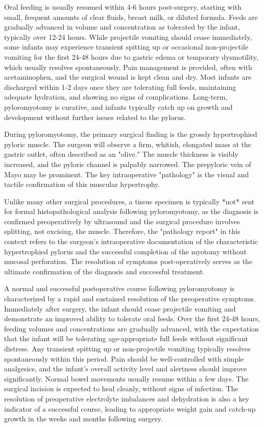 Oral feeding is usually resumed within 4-6 hours post-surgery, starting with small, frequent amounts of clear fluids, breast milk, or diluted formula. Feeds are gradually advanced in volume and concentration as tolerated by the infant, typically over 12-24 hours. While projectile vomiting should cease immediately, some infants may experience transient spitting up or occasional non-projectile vomiting for the first 24-48 hours due to gastric edema or temporary dysmotility, which usually resolves spontaneously. Pain management is provided, often with acetaminophen, and the surgical wound is kept clean and dry. Most infants are discharged within 1-2 days once they are tolerating full feeds, maintaining adequate hydration, and showing no signs of complications. Long-term, pyloromyotomy is curative, and infants typically catch up on growth and development without further issues related to the pylorus.

During pyloromyotomy, the primary surgical finding is the grossly hypertrophied pyloric muscle. The surgeon will observe a firm, whitish, elongated mass at the gastric outlet, often described as an "olive." The muscle thickness is visibly increased, and the pyloric channel is palpably narrowed. The prepyloric vein of Mayo may be prominent. The key intraoperative "pathology" is the visual and tactile confirmation of this muscular hypertrophy.

Unlike many other surgical procedures, a tissue specimen is typically *not* sent for formal histopathological analysis following pyloromyotomy, as the diagnosis is confirmed preoperatively by ultrasound and the surgical procedure involves splitting, not excising, the muscle. Therefore, the "pathology report" in this context refers to the surgeon's intraoperative documentation of the characteristic hypertrophied pylorus and the successful completion of the myotomy without mucosal perforation. The resolution of symptoms post-operatively serves as the ultimate confirmation of the diagnosis and successful treatment.

A normal and successful postoperative course following pyloromyotomy is characterized by a rapid and sustained resolution of the preoperative symptoms. Immediately after surgery, the infant should cease projectile vomiting and demonstrate an improved ability to tolerate oral feeds. Over the first 24-48 hours, feeding volumes and concentrations are gradually advanced, with the expectation that the infant will be tolerating age-appropriate full feeds without significant distress. Any transient spitting up or non-projectile vomiting typically resolves spontaneously within this period. Pain should be well-controlled with simple analgesics, and the infant's overall activity level and alertness should improve significantly. Normal bowel movements usually resume within a few days. The surgical incision is expected to heal cleanly, without signs of infection. The resolution of preoperative electrolyte imbalances and dehydration is also a key indicator of a successful course, leading to appropriate weight gain and catch-up growth in the weeks and months following surgery.

